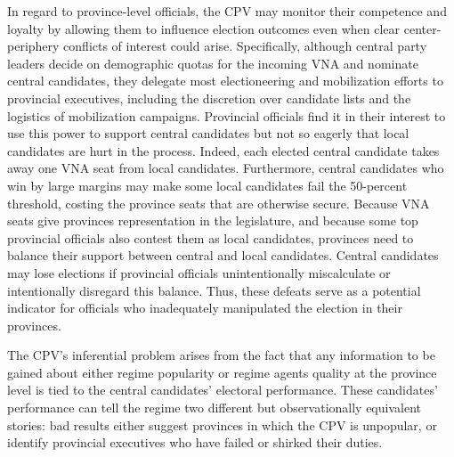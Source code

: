 \documentclass[12pt]{article}
\newcommand{\1}{\mathbbm{1}}
\begin{document}
In regard to province-level officials, the CPV may monitor their competence and loyalty by allowing them to influence election outcomes even when clear center-periphery conflicts of interest could arise. Specifically, although central party leaders decide on demographic quotas for the incoming VNA and nominate central candidates, they delegate most electioneering and mobilization efforts to provincial executives, including the discretion over candidate lists and the logistics of mobilization campaigns. Provincial officials find it in their interest to use this power to support central candidates but not so eagerly that local candidates are hurt in the process. Indeed, each elected central candidate takes away one VNA seat from local candidates.
Furthermore, central candidates who win by large margins may make some local candidates fail the 50-percent threshold, costing the province seats that are otherwise secure. Because VNA seats give provinces representation in the legislature, and because some top provincial officials also contest them as local candidates, provinces need to balance their support between central and local candidates. Central candidates may lose elections if provincial officials unintentionally miscalculate or intentionally disregard this balance. Thus, these defeats serve as a potential indicator for officials who inadequately manipulated the election in their provinces.

The CPV's inferential problem arises from the fact that any information to be gained about either regime popularity or regime agents quality at the province level is tied to the central candidates' electoral performance. These candidates' performance can tell the regime two different but observationally equivalent stories: bad results either suggest provinces in which the CPV is unpopular, or identify provincial executives who have failed or shirked their duties. 
\end{document}
